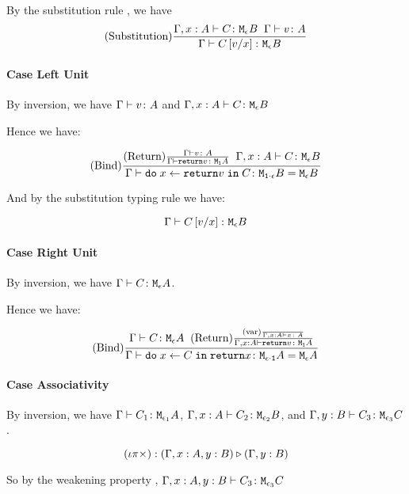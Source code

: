 {        By the substitution rule , we have 
        $$\treerule{Substitution}{\typerelation{\gax}{C}{\meb}\s\s\gtyperelation{v}{A}}{\gtyperelation{C\ssub{x}{v}}{\meb}}$$
        \paragraph{Case Left Unit}
        By inversion, we have $\gtyperelation{v}{A}$ and $\typerelation{\gax }{C}{\meb}$

        Hence we have:


        \begin{equation}
            \treerule{Bind}{\treerule{Return}{\gtyperelation{v}{A}}{\gtyperelation{\return{v}}{\moa}}\s\s\typerelation{\gax}{C}{\meb}}{\gtyperelation{\doin{x}{\return{v}}{C}}{\M{\1\dot\e}{B} = \meb}}
        \end{equation}

        And by the substitution typing rule we have: 

        \begin{equation}
            \gtyperelation{C\ssub{x}{v}}{\meb}
        \end{equation}
        \paragraph{Case Right Unit}
        By inversion, we have $\gtyperelation{C}{\mea}$.

        Hence we have:

        \begin{equation}
            \treerule{Bind}{
                \gtyperelation{C}{\mea}
                \s\s
                \treerule{Return}{\treerule{var}{}{\typerelation{\gax}{x}{A}}}{\typerelation{\gax}{\return{v}}{\moa}}
            }{\gtyperelation{\doin{x}{C}{\return{x}}}{\M{\e\dot\1}{A} = \mea}}
        \end{equation}
        \paragraph{Case Associativity}
        By inversion, we have $\gtyperelation{C_1}{\M{\e_1}{A}}$, $\typerelation{\gax}{C_2}{\M{\e_2}{B}}$, and $\typerelation{\gby}{C_3}{\M{\e_3}{C}}$.

       
        
        $$\wrel{(\i\pi\times)}{(\gax, y: B)}{(\gby)}$$

        So by the weakening property , $\typerelation{\gax, y: B}{C_3}{\M{\e_3}{C}}$

}
